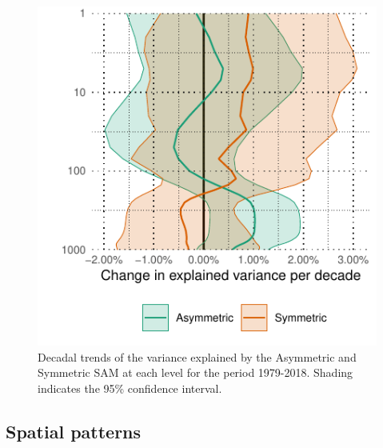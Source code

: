 \documentclass[]{ametsocV5}
\begin{document}
\begin{figure}
\includegraphics{r-squared-trend-1} \caption[Decadal trends of the variance explained by the Asymmetric and Symmetric SAM at each level for the period 1979-2018]{Decadal trends of the variance explained by the Asymmetric and Symmetric SAM at each level for the period 1979-2018. Shading indicates the 95\% confidence interval.}\label{fig:r-squared-trend}
\end{figure}

\subsection{Spatial patterns}
\end{document}
